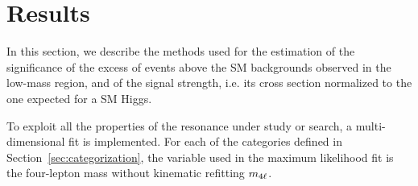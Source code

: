 \section{Results}

In this section, we describe the methods used for the estimation of the significance of the excess of events above the SM backgrounds observed in the low-mass region, and of the signal strength, i.e. its cross section normalized to the one expected for a SM Higgs.

To exploit all the properties of the resonance under study or search, a multi-dimensional fit is implemented.
For each of the categories defined in Section~\ref{sec:categorization}, the variable used in the maximum likelihood fit is the four-lepton mass without kinematic refitting $m_{4\ell}$. 

